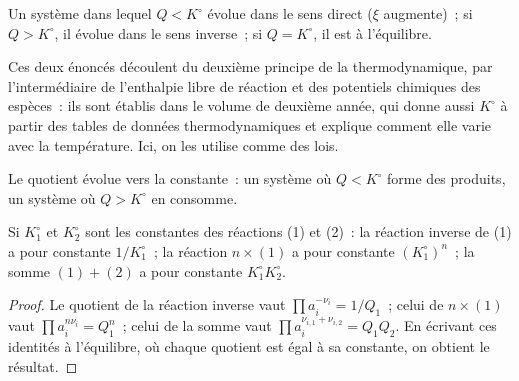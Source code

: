 \begin{proposition}\label{prop:b1:extent-q-and-k:direction}
Un système dans lequel $Q < K^\circ$ évolue dans le sens direct ($\xi$
augmente)~; si $Q > K^\circ$, il évolue dans le sens inverse~; si
$Q = K^\circ$, il est à l'équilibre.
\end{proposition}
\admitted

\begin{remark}\label{rem:b1:extent-q-and-k:origin}
Ces deux énoncés découlent du deuxième principe de la thermodynamique,
par l'intermédiaire de l'enthalpie libre de réaction et des potentiels
chimiques des espèces~: ils sont établis dans le volume de deuxième
année, qui donne aussi $K^\circ$ à partir des tables de données
thermodynamiques et explique comment elle varie avec la température. Ici,
on les utilise comme des lois.
\end{remark}

\begin{omfigure}

{\small Le quotient évolue vers la constante~: un système où $Q <
K^\circ$ forme des produits, un système où $Q > K^\circ$ en consomme.}
\end{omfigure}

\begin{proposition}\label{prop:b1:extent-q-and-k:combine-k}
Si $K_1^\circ$ et $K_2^\circ$ sont les constantes des réactions (1) et
(2)~: la réaction inverse de (1) a pour constante $1/K_1^\circ$~; la
réaction $n \times
(1)$ a pour constante $(K_1^\circ)^n$~; la somme $(1) + (2)$ a pour
constante $K_1^\circ K_2^\circ$.
\end{proposition}

\begin{proof}
Le quotient de la réaction inverse vaut $\prod a_i^{-\nu_i} = 1/Q_1$~;
celui de $n \times (1)$ vaut $\prod a_i^{n\nu_i} = Q_1^n$~; celui de la
somme vaut
$\prod a_i^{\nu_{i,1} + \nu_{i,2}} = Q_1 Q_2$. En écrivant ces identités
à l'équilibre, où chaque quotient est égal à sa constante, on obtient le
résultat.
\end{proof}

